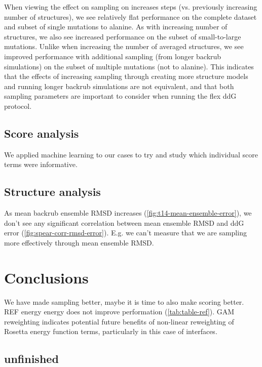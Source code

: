 When viewing the effect on sampling on increases steps (vs. previously increasing number of structures), we see relatively flat performance on the complete dataset and subset of single mutations to alanine.
As with increasing number of structures, we also see increased performance on the subset of small-to-large mutations.
Unlike when increasing the number of averaged structures, we see improved performance with additional sampling (from longer backrub simulations) on the subset of multiple mutations (not to alanine). This indicates that the effects of increasing sampling through creating more structure models and running longer backrub simulations are not equivalent, and that both sampling parameters are important to consider when running the flex ddG protocol.

\subsection{Score analysis}

We applied machine learning to our cases to try and study which individual score terms were informative.

\subsection{Structure analysis}

As mean backrub ensemble RMSD increases (\cref{fig:t14-mean-ensemble-error}), we don't see any significant correlation between mean ensemble RMSD and ddG error (\cref{fig:spear-corr-rmsd-error}). E.g. we can't measure that we are sampling more effectively through mean ensemble RMSD.

\section{Conclusions}

We have made sampling better, maybe it is time to also make scoring better. REF energy energy does not improve performation (\cref{tab:table-ref}).
GAM reweighting indicates potential future benefits of non-linear reweighting of Rosetta energy function terms, particularly in this case of interfaces.

\subsection{unfinished}

